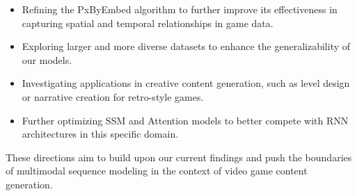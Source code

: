 \documentclass[10pt,a4paper]{article}
\begin{document}
\begin{itemize}
    \item Refining the PxByEmbed algorithm to further improve its effectiveness in capturing spatial and temporal relationships in game data.
    \item Exploring larger and more diverse datasets to enhance the generalizability of our models.
    \item Investigating applications in creative content generation, such as level design or narrative creation for retro-style games.
    \item Further optimizing SSM and Attention models to better compete with RNN architectures in this specific domain.
\end{itemize}

These directions aim to build upon our current findings and push the boundaries of multimodal sequence modeling in the context of video game content generation.




\end{document}
